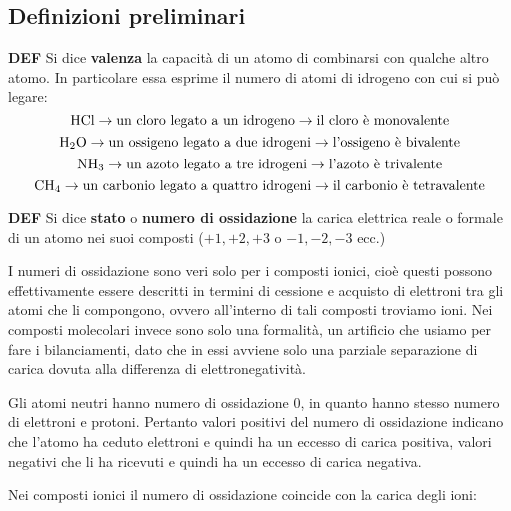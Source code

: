 \subsection{Definizioni preliminari}
\textbf{DEF} Si dice \textbf{valenza} la capacità di un atomo di combinarsi con qualche altro atomo. In particolare essa esprime il numero di atomi di idrogeno con cui si può legare:
$$\ce{HCl} \rightarrow \text{un cloro legato a un idrogeno} \rightarrow \text{il cloro è monovalente}$$
$$\ce{H_2O} \rightarrow \text{un ossigeno legato a due idrogeni} \rightarrow \text{l'ossigeno è bivalente}$$
$$\ce{NH_3} \rightarrow \text{un azoto legato a tre idrogeni} \rightarrow \text{l'azoto è trivalente}$$
$$\ce{CH_4} \rightarrow \text{un carbonio legato a quattro idrogeni} \rightarrow \text{il carbonio è tetravalente}$$

\textbf{DEF} Si dice \textbf{stato} o \textbf{numero di ossidazione} la carica elettrica reale o formale di un atomo nei suoi composti ($+1,+2,+3$ o $-1,-2,-3$ ecc.)

\vspace{0.2cm}I numeri di ossidazione sono veri solo per i composti ionici, cioè questi possono effettivamente essere descritti in termini di cessione e acquisto di elettroni tra gli atomi che li compongono, ovvero all'interno di tali composti troviamo ioni. Nei composti molecolari invece sono solo una formalità, un artificio che usiamo per fare i bilanciamenti, dato che in essi avviene solo una parziale separazione di carica dovuta alla differenza di elettronegatività.

\vspace{0.2cm}Gli atomi neutri hanno numero di ossidazione 0, in quanto hanno stesso numero di elettroni e protoni. Pertanto valori positivi del numero di ossidazione indicano che l'atomo ha ceduto elettroni e quindi ha un eccesso di carica positiva, valori negativi che li ha ricevuti e quindi ha un eccesso di carica negativa.

Nei composti ionici il numero di ossidazione coincide con la carica degli ioni:

